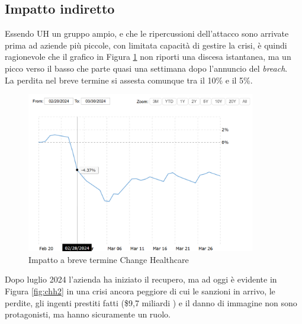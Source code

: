 \documentclass[12pt,a4paper,twoside]{report}
\begin{document}
\subsection{Impatto indiretto}
Essendo UH un gruppo ampio, e che le ripercussioni dell'attacco sono arrivate prima ad aziende pi\`u piccole, con limitata capacit\`a di gestire la crisi, \`e quindi ragionevole che il grafico in Figura \ref{fig:chh1} \cite{macrotrends_unhealth} non riporti una discesa istantanea, ma un picco verso il basso che parte quasi una settimana dopo l'annuncio del \textit{breach}.\\
La perdita nel breve termine si assesta comunque tra il 10\% e il 5\%.\\
\begin{figure}[H] 
\begin{center} 
\includegraphics[width=10cm]{figures/chHealth_short.png} 
\caption[Grafico Change Healthcare short]{Impatto a breve termine Change Healthcare}\label{fig:chh1}
\end{center}
\end{figure}

Dopo luglio 2024 l'azienda ha iniziato il recupero, ma ad oggi \`e evidente in Figura \ref{fig:chh2} \cite{macrotrends_unhealth} in una crisi ancora peggiore di cui le sanzioni in arrivo, le perdite, gli ingenti prestiti fatti (\$9,7 miliardi \cite{ChHealth_lessons}) e il danno di immagine non sono protagonisti, ma hanno sicuramente un ruolo.\\
\end{document}
